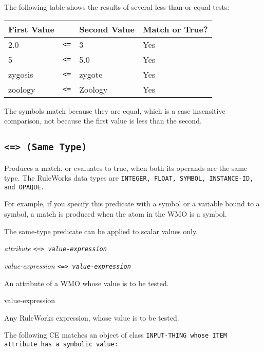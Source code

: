 \Example

The following table shows the results of several less-than-or equal
tests:

\begin{center}
\begin{tabular}{lcll}
  \toprule
  First Value &   & Second Value & Match or True? \\
  \midrule
  2.0         & \verb|<=| & 3            & Yes \\
  5           & \verb|<=| & 5.0          & Yes \\
  zygosis     & \verb|<=| & zygote       & Yes \\
  zoology     & \verb|<=| & Zoology      & Yes \\
  \bottomrule
\end{tabular}
\end{center}

The symbols match because they are equal, which is a case insensitive
comparison, not because the first value is less than the second.

\subsection{\tt{<=>} (Same Type)}

Produces a match, or evaluates to true, when both its operands are the
same type. The RuleWorks data types are \tt{INTEGER}, \tt{FLOAT},
\tt{SYMBOL}, \tt{INSTANCE-ID}, and \tt{OPAQUE}.

For example, if you specify this predicate with a symbol or a variable
bound to a symbol, a match is produced when the atom in the WMO is a
symbol.

The same-type predicate can be applied to scalar values only.

\Format

\ct\it{attribute} \tt{<=>} \it{value-expression}

\it{value-expression} \tt{<=>} \it{value-expression}

An attribute of a WMO whose value is to be tested.

\begin{arguments}
\item[value-expression]
  
  Any RuleWorks expression, whose value is to be tested.
\end{arguments}

\Example

The following CE matches an object of class \tt{INPUT-THING} whose
\ct\tt{ITEM} attribute has a symbolic value:


